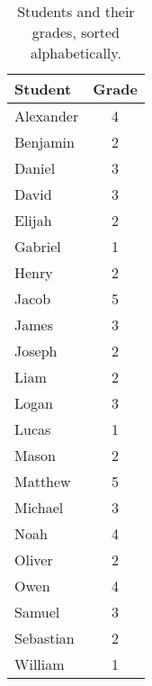 \begin{table}[!ht]
  \centering
  \begin{tabular}{|l|c|}
    \hline
    Student   & Grade \\
    \hline
    \hline
    Alexander & 4 \\
    \hline
    Benjamin  & 2 \\
    \hline
    Daniel    & 3 \\
    \hline
    David     & 3 \\
    \hline
    Elijah    & 2 \\
    \hline
    Gabriel   & 1 \\
    \hline
    Henry     & 2 \\
    \hline
    Jacob     & 5 \\
    \hline
    James     & 3 \\
    \hline
    Joseph    & 2 \\
    \hline
    Liam      & 2 \\
    \hline
    Logan     & 3 \\
    \hline
    Lucas     & 1 \\
    \hline
    Mason     & 2 \\
    \hline
    Matthew   & 5 \\
    \hline
    Michael   & 3 \\
    \hline
    Noah      & 4 \\
    \hline
    Oliver    & 2 \\
    \hline
    Owen      & 4 \\
    \hline
    Samuel    & 3 \\
    \hline
    Sebastian & 2 \\
    \hline
    William   & 1 \\
    \hline
  \end{tabular}
  \caption{Students and their grades, sorted alphabetically.}
  \label{tab:marks}
\end{table}

